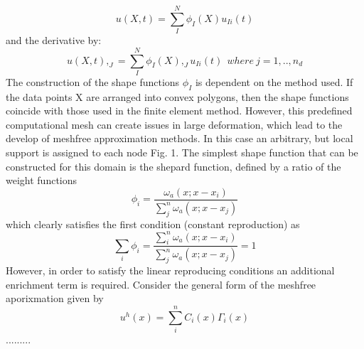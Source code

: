 \begin{equation}
u(X,t) = \sum_I^N \phi_I(X) u_{Ii}(t)
\end{equation}
and the derivative by:
\begin{equation}
u(X,t),_J = \sum_I^N \phi_I(X),_J u_{Ii}(t) ~~where~j = 1,..,n_d
\end{equation}
The construction of the shape functions $\phi_I$ is dependent on the method used. If the data points X are arranged into convex polygons, then the shape functions coincide with those used in the finite element method. However, this predefined computational mesh can create issues in large deformation, which lead to the develop of meshfree approximation methods. In this case an arbitrary, but local support is assigned to each node Fig. 1. The simplest shape function that can be constructed for this domain is the shepard function, defined by a ratio of the weight functions
\begin{equation}
\phi_i = \frac{\omega_a (x; x-x_i)}{\sum_j^n \omega_a(x;x-x_j)} 
\end{equation}
which clearly satisfies the first condition (constant reproduction) as
\begin{equation}
\sum_i \phi_i = \frac{\sum_i^n\omega_a (x; x-x_i)}{\sum_j^n \omega_a(x;x-x_j)} = 1
\end{equation}
However, in order to satisfy the linear reproducing conditions an additional enrichment term is required. Consider the general form of the meshfree aporixmation given by 
\begin{equation}
u^h(x) = \sum_i^n C_i(x) \Gamma_i(x)
\end{equation}
.........



